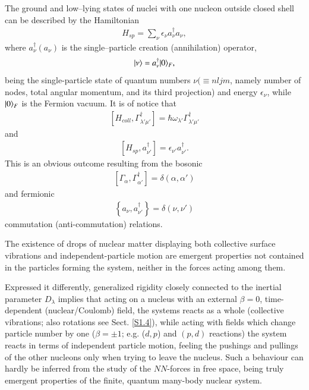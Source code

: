 The ground and low--lying states of nuclei with one nucleon outside closed shell can be described by the Hamiltonian
\begin{align}\label{eq1.0.10}
H_{sp}=\sum_{\nu}\epsilon_\nu a_\nu^\dagger a_\nu,
\end{align}
where $a_\nu^\dagger (a_\nu)$ is the single--particle creation (annihilation) operator,
\begin{align}\label{eq1.0.11}
|{\nu} \rangle=a_\nu^\dagger|{0} \rangle_F,
\end{align}
being the single-particle state of quantum numbers $\nu(\equiv nljm$, namely number of nodes, total angular momentum, and its third projection) and energy $\epsilon_\nu$, while $|{0} \rangle_F$ is the Fermion vacuum. 
It is of notice that
\begin{align}\label{eq0.1.14}
\left[H_{coll},\Gamma^\dagger_{\lambda'\mu'}\right]=\hbar\omega_{\lambda'}\Gamma^\dagger_{\lambda'\mu'}
\end{align}
and 
\begin{align}\label{eq0.1.15}
\left[H_{sp},a^\dagger_{\nu'}\right]=\epsilon_{\nu'}a^\dagger_{\nu'}.
\end{align}
	This is an obvious outcome resulting from the bosonic
\begin{align}\label{eq0.1.16}
\left[\Gamma_{\alpha},\Gamma^\dagger_{\alpha'}\right]=\delta(\alpha,\alpha')
\end{align}
	and fermionic
\begin{align}
\left\{a_\nu,a^\dagger_{\nu'}\right\}=\delta(\nu,\nu')
\end{align}
commutation (anti-commutation) relations.


 The existence of drops of nuclear matter displaying both collective surface vibrations and independent-particle motion  are emergent properties not contained in the particles forming the system, neither in the forces acting among them. 


Expressed it differently, generalized rigidity closely connected to the inertial parameter $D_\lambda$ implies that acting on a nucleus with an external $\beta=0$, time-dependent (nuclear/Coulomb) field, the systems reacts as a whole (collective vibrations; also rotations see Sect. \ref{S1.4}), while acting with fields which change particle number by one ($\beta=\pm1$; e.g. ($d,p$) and $(p,d)$ reactions) the system reacts in terms of independent particle motion, feeling the pushings and pullings of the other nucleons only when trying to leave the nucleus. Such a behaviour can hardly be inferred from the study of the $NN$-forces in free space, being truly emergent properties of the finite, quantum many-body nuclear system.


